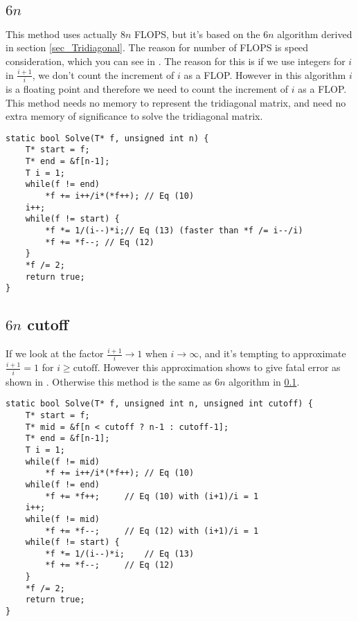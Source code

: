 \documentclass[11pt,english,a4paper]{article}
\begin{document}
\begin{flushleft}
\subsection{$6n$}\label{sec_6n}

This method uses actually $8n$ FLOPS, but it's based on the $6n$ algorithm derived in section \ref{sec_Tridiagonal}. The reason for number of FLOPS is speed consideration, which you can see in . The reason for this is if we use integers for $i$ in $\frac{i+1}{i}$, we don't count the increment of $i$ as a FLOP. However in this algorithm $i$ is a floating point and therefore we need to count the increment of $i$ as a FLOP. This method needs no memory to represent the tridiagonal matrix, and need no extra memory of significance to solve the tridiagonal matrix.

\begin{lstlisting}[frame=single, caption={\texttt{Matrix<MatrixType::Tridiagonal\_minus1\_2\_minus1\_6n, T>::Solve}}]  
static bool Solve(T* f, unsigned int n) {
	T* start = f;
	T* end = &f[n-1];
	T i = 1;
	while(f != end)
		*f += i++/i*(*f++);	// Eq (10)
	i++;
	while(f != start) {
		*f *= 1/(i--)*i;// Eq (13) (faster than *f /= i--/i)
		*f += *f--;	// Eq (12)
	}
	*f /= 2;
	return true;
}
\end{lstlisting} 

\subsection{$6n$ cutoff}

If we look at the factor $\frac{i+1}{i} \to 1$ when $i\to \infty$, and it's tempting to approximate $\frac{i+1}{i} =1$ for $i \geq \mathrm{cutoff}$. However this approximation shows to give fatal error as shown in . Otherwise this method is the same as $6n$ algorithm in \ref{sec_6n}.

\begin{lstlisting}[frame=single, caption={\texttt{Matrix<MatrixType::Tridiagonal\_minus1\_2\_minus1\_6n, T>::Solve}}]  
static bool Solve(T* f, unsigned int n, unsigned int cutoff) {
	T* start = f;
	T* mid = &f[n < cutoff ? n-1 : cutoff-1];
	T* end = &f[n-1];
	T i = 1;
	while(f != mid)
		*f += i++/i*(*f++);	// Eq (10)
	while(f != end)
		*f += *f++;		// Eq (10) with (i+1)/i = 1
	i++;
	while(f != mid)
		*f += *f--;		// Eq (12) with (i+1)/i = 1
	while(f != start) {
		*f *= 1/(i--)*i;	// Eq (13)
		*f += *f--;		// Eq (12)
	}
	*f /= 2;
	return true;
}
\end{lstlisting} 


\end{flushleft}
\end{document}
